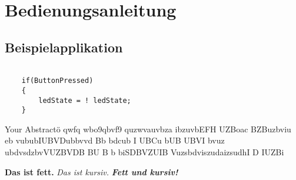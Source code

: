 \documentclass[12pt,a4paper]{article}
\begin{document}
\newpage
\section{Bedienungsanleitung}
\subsection{Beispielapplikation}
\begin{verbatim}

    if(ButtonPressed)
    {
        ledState = ! ledState;
    }

\end{verbatim}

Your Abstractö qwfq wbo9qbvf9 quzwvauvbza ibzuvbEFH UZBoac BZBuzbviu eb vububIUBVDubbvvd Bb bdcub I UBCu bUB UBVI bvuz ubdvsdzbvVUZBVDB BU B b  biSDBVZUIB VuzsbdviszudaizsudhI D IUZBi


\textbf{Das ist fett.}
\textit{Das ist kursiv.}
\textbf{\textit{Fett und kursiv!}}
\end{document}
